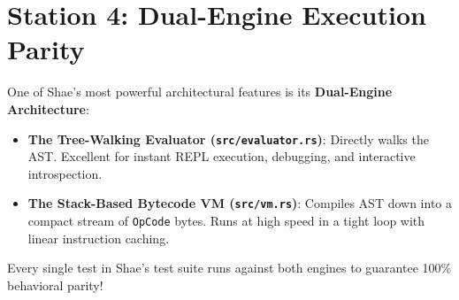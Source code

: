 \section{Station 4: Dual-Engine Execution Parity}

One of Shae's most powerful architectural features is its \textbf{Dual-Engine Architecture}:
\begin{itemize}
    \item \textbf{The Tree-Walking Evaluator (\texttt{src/evaluator.rs})}: Directly walks the AST. Excellent for instant REPL execution, debugging, and interactive introspection.
    \item \textbf{The Stack-Based Bytecode VM (\texttt{src/vm.rs})}: Compiles AST down into a compact stream of \texttt{OpCode} bytes. Runs at high speed in a tight loop with linear instruction caching.
\end{itemize}
Every single test in Shae's test suite runs against both engines to guarantee 100\% behavioral parity!

